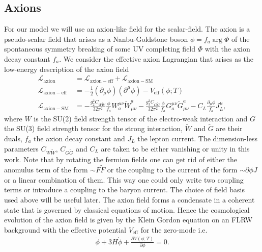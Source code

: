 \documentclass[13pt,a4paper,titlepage]{article}
\begin{document}
\subsection{Axions}
\label{sec:axions}

For our model we will use an axion-like field for the scalar-field.
The axion is a pseudo-scalar field that arises as a Nanbu-Goldstone boson $\phi = f_a \arg \Phi$ of the spontaneous symmetry breaking of some UV completing field $\Phi$ with the axion decay constant $f_a$.
We consider the effective axion Lagrangian that arises as the low-energy description of the axion field \cite[sec. 2.5]{Di_Luzio_2020_Landscape_of_QCD_Axion_models}
\begin{align}
    \mathcal{L}_{\mathrm{axion}} &= \mathcal{L}_{\mathrm{axion-eff}} + \mathcal{L}_{\mathrm{axion-SM}} \\
    \mathcal{L}_{\mathrm{axion-eff}} &= - \frac{1}{2} (\partial_\mu \phi) (\partial^\mu \phi) - V_\mathrm{eff}(\phi; T) \\
    \mathcal{L}_{\mathrm{axion-SM}} &=
        - \frac{g_2^2 C_{W\tilde{W}}}{32 \pi^2} \frac{\phi}{f_a} W_a^{\mu \nu}\tilde{W}^a_{\mu \nu}
        - \frac{g_3^2 C_{G\tilde{G}}}{32 \pi^2} \frac{\phi}{f_a} G_a^{\mu \nu}\tilde{G}^a_{\mu \nu}
        - C_{L} \frac{\partial_\mu \phi}{f_a} J^\mu_L,
\end{align}
where $W$ is the SU(2) field strength tensor of the electro-weak interaction and $G$ the SU(3) field strength tensor for the strong interaction, $\tilde{W}$ and $\tilde{G}$ are their duals, $f_a$ the axion decay constant and $J_L$ the lepton current.
The dimension-less parameters $C_{W\tilde{W}}$, $C_{G\tilde{G}}$ and $C_L$ are taken to be either vanishing or unity in this work.
Note that by rotating the fermion fields one can get rid of either the anomulus term of the form $\sim F \tilde{F}$ or the coupling to the current of the form $\sim \partial \phi J$
or a linear combination of them. This way one could only write two coupling terms or
introduce a coupling to the baryon current. The choice of field basis used above will be useful later.
The axion field forms a condensate in a coherent state that is governed by classical
equations of motion. Hence the cosmological evolution of the axion field is given by
the Klein Gordon equation on an FLRW background \cite[chap. 1, 2]{the_early_universe_kolb_and_turner} with the effective potential $V_\mathrm{eff}$ for the zero-mode i.e. \cite[sec. 4.1, 4.2]{Axion_Cosmology_Marsh_2016}
\begin{align}
    \label{eq:axion_klein_gordon}
    \ddot{\phi} + 3 H \dot{\phi} + \frac{\partial V(\phi; T)}{\partial \phi} = 0.
\end{align}
\end{document}
